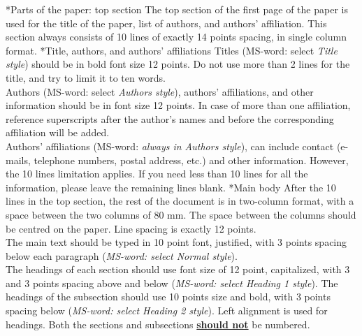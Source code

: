 \documentclass[twocolumn, a4paper,10pt]{article}
\makeatletter
\renewcommand\section{\@startsection{section}{1}{\z@}{3pt}{3pt}{\normalfont\large\bfseries}}
\renewcommand\subsection{\@startsection{subsection}{1}{\z@}{\z@}{\z@}{\normalfont\normalsize\bfseries}}
\renewcommand\subsection{\@startsection{subsection}{1}{\z@}{\z@}{0.1pt}{\normalfont\normalsize\bfseries}}
\makeatother
\begin{document}
\section*{Parts of the paper: top section}
The top section of the first page of the paper is used for the title of the paper, list of authors, and authors' affiliation. This section always consists of 10 lines of exactly 14 points spacing, in single column format.
\subsection*{Title, authors, and authors' affiliations}
Titles (MS-word: select \textit{Title style}) should be in bold font size 12 points. Do not use more than 2 lines for the title, and try to limit it to ten words.\\
Authors (MS-word: select \textit{Authors style}), authors' affiliations, and other information should be in font size 12 points. In case of more than one affiliation, reference superscripts after the author's names and before the corresponding affiliation will be added.\\
Authors' affiliations (MS-word: \textit{always in Authors style}), can include contact (e-mails, telephone numbers, postal address, etc.) and other information. However, the 10 lines limitation applies. If you need less than 10 lines for all the information, please leave the remaining lines blank.
\section*{Main body}
After the 10 lines in the top section, the rest of the document is in two-column format, with a space between the two columns of 80 mm. The space between the columns should be centred on the paper. Line spacing is exactly 12 points.\\
The main text should be typed in 10 point font, justified, with 3 points spacing below each paragraph (\textit{MS-word: select \textit{Normal style}}).\\
The headings of each section should use font size of 12 point, capitalized, with 3 and 3 points spacing above and below (\textit{MS-word: select \textit{Heading 1 style}}). The headings of the subsection should use 10 points size and bold, with 3 points spacing below (\textit{MS-word: select \textit{Heading 2 style}}). Left alignment is used for headings. Both the sections and subsections \underline{\textbf{should not}} be numbered.
\end{document}
